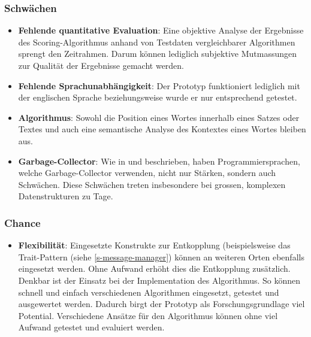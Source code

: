 \subsubsection{Schwächen}

\begin{itemize}
    \item \textbf{Fehlende quantitative Evaluation}: Eine objektive Analyse der Ergebnisse des Scoring-Algorithmus anhand von Testdaten vergleichbarer Algorithmen sprengt den Zeitrahmen. Darum kön\-nen lediglich subjektive Mutmassungen zur Qualität der Ergebnisse gemacht werden.
    \item \textbf{Fehlende Sprachunabhängigkeit}: Der Prototyp funktioniert lediglich mit der englischen Sprache beziehungsweise wurde er nur entsprechend getestet.
    \item \textbf{Algorithmus}: Sowohl die Position eines Wortes innerhalb eines Satzes oder Textes und auch eine semantische Analyse des Kontextes eines Wortes bleiben aus.
    \item \textbf{Garbage-Collector}: Wie in \cite[S.~1-3]{cohen2015data} und \cite[S.~1-2]{nguyen2016yak} beschrieben, haben Programmiersprachen, welche Garbage-Collector verwenden, nicht nur Stär\-ken, sondern auch Schwächen. Diese Schwächen treten insbesondere bei grossen, komplexen Datenstrukturen zu Tage.
    
\end{itemize}

\subsubsection{Chance}

\begin{itemize}
    \item \textbf{Flexibilität}: Eingesetzte Konstrukte zur Entkopplung (beispielsweise das Trait-Pattern (siehe \autoref{s-message-manager}) können an weiteren Orten ebenfalls eingesetzt werden. Ohne Aufwand er\-höht dies die Entkopplung zusätzlich. Denkbar ist der Einsatz bei der Implementation des Algorithmus. So können schnell und einfach verschiedenen Algorithmen eingesetzt, getestet und ausgewertet werden. Dadurch birgt der Prototyp als Forschungsgrundlage viel Potential. Verschiedene Ansätze für den Algorithmus können ohne viel Aufwand getestet und evaluiert werden.
\end{itemize}



